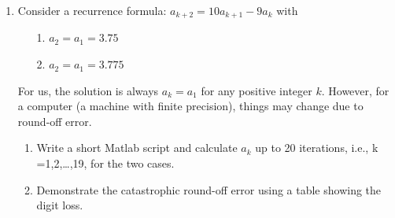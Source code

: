 \documentclass[10pt]{report}
\begin{document}
\begin{enumerate}
\begin{enumerate}
\begin{enumerate}
			\item 
			How many terms are required?
			\\
			If the zero terms are counted as well, the number of terms required is 21, 73, 119 and 155 for $x = \pi/2, 11\pi/2, 21\pi/2$, and $31\pi/2$ respectively.
			
			\item 
			What is the largest term in the series?
			\\
			The largest term is 1.5708, \num{3.0665e6}, \num{1.4673e13} and \num{7.9890e19} for $x = \pi/2, 11\pi/2, 21\pi/2$, and $31\pi/2$ respectively.
		\end{enumerate}
	
		\item 
		What do you conclude about the use of floating-point arithmetic and power series to evaluate functions?
		\\
		It's probably a bad idea to do that if the power series converge slowly enough for the errors introduced due to floating-point arithmetic to grow into a notable inaccuracy.
	\end{enumerate}
	\textit{Things learned:} Numbers a computer can represent is finite. \texttt{eps(x)} can be used to get the distance of \texttt{x} to the closest number larger than \texttt{x}. When an operant is small enough, a calculation may turn out not as expected. The result of a calculation is rounded to the nearest representable number. Using power series to approximate $\sin$ is not quite preferable due to floating-point arithmetic. The power series of $\sin$ may consists of really large number which affects the precision.
	
	\item 
	Consider a recurrence formula: $a_{k+2} = 10a_{k+1} - 9a_k$ with
	\begin{enumerate}
		\item [1.]
		$a_2 = a_1 = 3.75$
		\item [2.]
		$a_2 = a_1 = 3.775$
	\end{enumerate}
	For us, the solution is always $a_k = a_1$ for any positive integer $k$. However, for a computer (a machine with finite precision), things may change due to round-off error.
	\begin{enumerate}
		\item 
		Write a short Matlab script and calculate $a_k$ up to 20 iterations, i.e., k =1,2,\dots,19, for the two cases.
		
		
		\item 
		Demonstrate the catastrophic round-off error using a table showing the digit loss.
		

\end{enumerate}
\end{enumerate}
\end{document}

